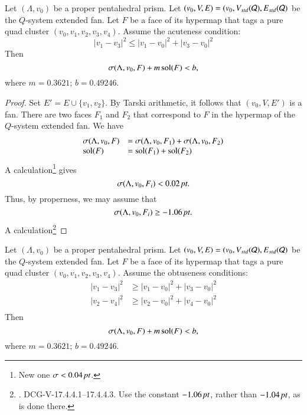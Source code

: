 \begin{lemma}
Let $(\Lambda,v_0)$ be a proper pentahedral prism.
Let $(v_0,V,E) = (v_0,V_{std}({\mathcal Q}),E_{std}({\mathcal Q})$ be the $Q$-system
extended fan.
Let $F$ be a face
of its hypermap that tags a pure quad cluster $(v_0,v_1,v_2,v_3,v_4)$.
Assume the acuteness condition:
  $$
  |v_1-v_3|^2 \le |v_1-v_0|^2 + |v_3-v_0|^2
  $$
Then
  $$
  \sigma(\Lambda,v_0,F) + m \operatorname{sol}(F) < b, 
  $$
where $m = 0.3621$; $b = 0.49246$.
\end{lemma}

\begin{proof}
Set $E' = E\cup \{v_1,v_2\}$.  By Tarski arithmetic, it follows
that $(v_0,V,E')$ is a fan.  There are two faces  $F_1$ and $F_2$
that correspond to $F$ in the  hypermap of the $Q$-system extended fan.
We have
 $$
  \begin{array}{lll}
  \sigma(\Lambda,v_0,F) &= \sigma(\Lambda,v_0,F_1) + \sigma(\Lambda,v_0,F_2)\\
   \operatorname{sol}(F) &=\operatorname{sol}(F_1) + \operatorname{sol}(F_2)\\
 \end{array}
 $$
A calculation\footnote{ New one $\sigma < 0.04\,\hbox{\it pt}$.}
gives 
  $$
  \sigma(\Lambda,v_0,F_i) < 0.02\,\hbox{\it pt}.
  $$
Thus, by properness, we may assume that
  $$
  \sigma(\Lambda,v_0,F_i) \ge -1.06\,\hbox{\it pt}.
  $$
A calculation\footnote{. DCG-V-17.4.4.1--17.4.4.3.  
Use the constant $-1.06\,\hbox{\it pt}$, rather than $-1.04\,\hbox{\it pt}$, as is done there.}
\end{proof}


\begin{lemma}
Let $(\Lambda,v_0)$ be a proper pentahedral prism.
Let $(v_0,V,E) = (v_0,V_{std}({\mathcal Q}),E_{std}({\mathcal Q})$ be the $Q$-system
extended fan.
Let $F$ be a face
of its hypermap that tags a pure quad cluster $(v_0,v_1,v_2,v_3,v_4)$.
Assume the obtuseness conditions:
  $$
  \begin{array}{lll}
  |v_1-v_3|^2 &\ge |v_1-v_0|^2 + |v_3-v_0|^2\\
  |v_2-v_4|^2 &\ge |v_2-v_0|^2 + |v_4-v_0|^2\\
  \end{array}
  $$
Then
  $$
  \sigma(\Lambda,v_0,F) + m \operatorname{sol}(F) < b, 
  $$
where $m = 0.3621$; $b = 0.49246$.
\end{lemma}

